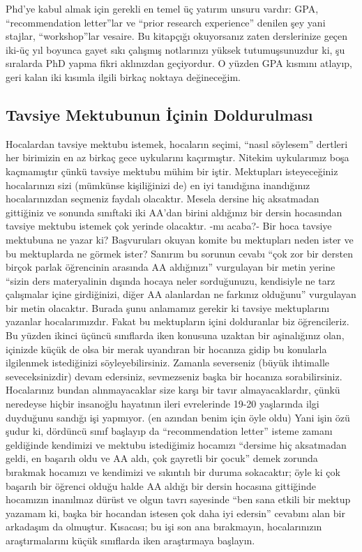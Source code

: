 \documentclass[12pt]{article}
\begin{document}
Phd’ye kabul almak için gerekli en temel üç yatırım unsuru vardır: GPA, “recommendation letter”lar ve “prior research experience” denilen şey yani stajlar, “workshop”lar vesaire. Bu kitapçığı okuyorsanız zaten derslerinize geçen iki-üç yıl boyunca gayet sıkı çalışmış notlarınızı yüksek tutumuşsunuzdur ki, şu sıralarda  PhD yapma fikri aklınızdan geçiyordur. O yüzden GPA kısmını atlayıp, geri kalan iki kısımla ilgili birkaç noktaya değineceğim.

\subsection{Tavsiye Mektubunun İçinin Doldurulması}
Hocalardan tavsiye mektubu istemek, hocaların seçimi, “nasıl söylesem” dertleri her birimizin en az birkaç gece uykularını kaçırmıştır. Nitekim uykularımız boşa kaçmamıştır çünkü tavsiye mektubu mühim bir iştir. Mektupları isteyeceğiniz hocalarınızı sizi (mümkünse kişiliğinizi de) en iyi tanıdığına inandığınız hocalarınızdan seçmeniz faydalı olacaktır. Mesela dersine hiç aksatmadan gittiğiniz ve sonunda sınıftaki iki AA’dan birini aldığınız bir dersin hocasından tavsiye mektubu istemek çok yerinde olacaktır. -mı acaba?- Bir hoca tavsiye mektubuna ne yazar ki? Başvuruları okuyan komite bu mektupları neden ister ve bu mektuplarda ne görmek ister? Sanırım bu sorunun cevabı “çok zor bir dersten birçok parlak öğrencinin arasında AA aldığınızı” vurgulayan bir metin yerine “sizin ders materyalinin dışında hocaya neler sorduğunuzu, kendisiyle ne tarz çalışmalar içine girdiğinizi, diğer AA alanlardan ne farkınız olduğunu” vurgulayan bir metin olacaktır. Burada şunu anlamamız gerekir ki tavsiye mektuplarını yazanlar hocalarımızdır. Fakat bu mektupların içini dolduranlar biz öğrencileriz. Bu yüzden ikinci üçüncü sınıflarda iken konusuna uzaktan bir aşinalığınız olan, içinizde küçük de olsa bir merak uyandıran bir hocanıza gidip bu konularla ilgilenmek istediğinizi söyleyebilirsiniz. Zamanla severseniz (büyük ihtimalle seveceksinizdir) devam edersiniz, sevmezseniz başka bir hocanıza sorabilirsiniz. Hocalarınız bundan alınmayacaklar size karşı bir tavır almayacaklardır, çünkü neredeyse hiçbir insanoğlu hayatının ileri evrelerinde 19-20 yaşlarında ilgi duyduğunu sandığı işi yapmıyor. (en azından benim için öyle oldu) Yani işin özü şudur ki, dördüncü sınıf başlayıp da “recommendation letter” isteme zamanı geldiğinde kendimizi ve mektubu istediğimiz hocamızı “dersime hiç aksatmadan geldi, en başarılı oldu ve AA aldı, çok gayretli bir çocuk” demek zorunda bırakmak hocamızı ve kendimizi ve sıkıntılı bir duruma sokacaktır; öyle ki çok başarılı bir öğrenci olduğu halde AA aldığı bir dersin hocasına gittiğinde hocamızın inanılmaz dürüst ve olgun tavrı sayesinde “ben sana etkili bir mektup yazamam ki, başka bir hocandan istesen çok daha iyi edersin” cevabını alan bir arkadaşım da olmuştur. Kısacası; bu işi son ana bırakmayın, hocalarınızın araştırmalarını küçük sınıflarda iken araştırmaya başlayın.
\end{document}
